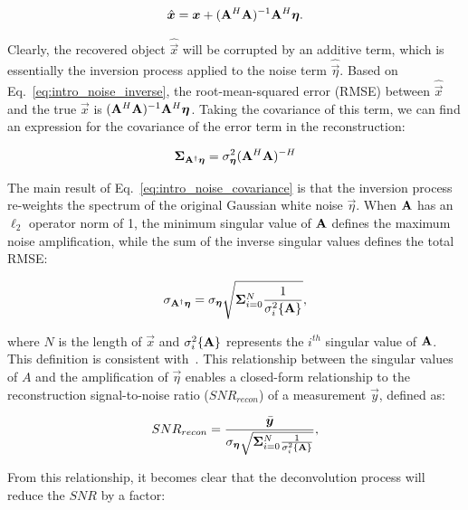 \begin{equation}\label{eq:intro_noise_inverse}
        \hat{\bm{\bm{x}}} = \bm{x} + (\mathbf{A}^H \mathbf{A})^{-1} \mathbf{A}^H \bm{\eta}.
\end{equation}

\noindent Clearly, the recovered object $\hat{\vec{x}}$ will be corrupted by an additive term, which is essentially the inversion process applied to the noise term $\hat{\vec{\eta}}$. Based on Eq.~\ref{eq:intro_noise_inverse}, the root-mean-squared error (RMSE) between $\hat{\vec{x}}$ and the true $\vec{x}$ is $(\mathbf{A}^H \mathbf{A})^{-1} \mathbf{A}^H \bm{\eta}$. Taking the covariance of this term, we can find an expression for the covariance of the error term in the reconstruction:

\begin{equation}\label{eq:intro_noise_covariance}
    \mathbf{\Sigma}_{\mathbf{A}^{\dagger}\bm{\eta}} = \sigma_{\bm{\eta}}^2 (\mathbf{A}^H \mathbf{A}) ^{-H}
\end{equation}

The main result of Eq.~\ref{eq:intro_noise_covariance} is that the inversion process re-weights the spectrum of the original Gaussian white noise $\vec{\eta}$. When $\mathbf{A}$ has an $\ell_2$ operator norm of 1, the minimum singular value of $\mathbf{A}$ defines the maximum noise amplification, while the sum of the inverse singular values defines the total RMSE:

\begin{equation}\label{eq:intro_noise_amplification}
    \sigma_{\mathbf{A}^{\dagger}\bm{\eta}} = \sigma_{\bm{\eta}} \sqrt{\mathbf{\Sigma}_{i=0}^N{\frac{1}{\sigma_i^2\{\mathbf{A}\}}}},
\end{equation}

\noindent where $N$ is the length of $\vec{x}$ and $\sigma_i^2 \{\mathbf{A}\}$ represents the $i^{th}$ singular value of $\mathbf{A}$. This definition is consistent with~\cite{agrawal2009optimal}. This relationship between the singular values of $A$ and the amplification of $\vec{\eta}$ enables a closed-form relationship to the reconstruction signal-to-noise ratio ($SNR_{recon}$) of a measurement $\vec{y}$, defined as:

\begin{equation}\label{eq:intro_snr_recon}
SNR_{recon} = \frac{\bar{\bm{y}}}{\sigma_{\bm{\eta}} \sqrt{\mathbf{\Sigma}_{i=0}^N{\frac{1}{\sigma_i^2\{\mathbf{A}\}}}}},
\end{equation}

\noindent From this relationship, it becomes clear that the deconvolution process will reduce the $SNR$ by a factor:

